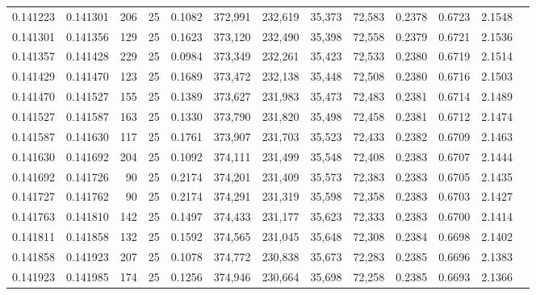 \begin{tabular}{rrrrrrrrrrrrr}
0.141223 & 0.141301 &   206 &  25 &                                     0.1082 & 372,991 & 232,619 &  35,373 &  72,583 & 0.2378 & 0.6723 & 2.1548 \\
0.141301 & 0.141356 &   129 &  25 &                                     0.1623 & 373,120 & 232,490 &  35,398 &  72,558 & 0.2379 & 0.6721 & 2.1536 \\
0.141357 & 0.141428 &   229 &  25 &                                     0.0984 & 373,349 & 232,261 &  35,423 &  72,533 & 0.2380 & 0.6719 & 2.1514 \\
0.141429 & 0.141470 &   123 &  25 &                                     0.1689 & 373,472 & 232,138 &  35,448 &  72,508 & 0.2380 & 0.6716 & 2.1503 \\
0.141470 & 0.141527 &   155 &  25 &                                     0.1389 & 373,627 & 231,983 &  35,473 &  72,483 & 0.2381 & 0.6714 & 2.1489 \\
0.141527 & 0.141587 &   163 &  25 &                                     0.1330 & 373,790 & 231,820 &  35,498 &  72,458 & 0.2381 & 0.6712 & 2.1474 \\
0.141587 & 0.141630 &   117 &  25 &                                     0.1761 & 373,907 & 231,703 &  35,523 &  72,433 & 0.2382 & 0.6709 & 2.1463 \\
0.141630 & 0.141692 &   204 &  25 &                                     0.1092 & 374,111 & 231,499 &  35,548 &  72,408 & 0.2383 & 0.6707 & 2.1444 \\
0.141692 & 0.141726 &    90 &  25 &                                     0.2174 & 374,201 & 231,409 &  35,573 &  72,383 & 0.2383 & 0.6705 & 2.1435 \\
0.141727 & 0.141762 &    90 &  25 &                                     0.2174 & 374,291 & 231,319 &  35,598 &  72,358 & 0.2383 & 0.6703 & 2.1427 \\
0.141763 & 0.141810 &   142 &  25 &                                     0.1497 & 374,433 & 231,177 &  35,623 &  72,333 & 0.2383 & 0.6700 & 2.1414 \\
0.141811 & 0.141858 &   132 &  25 &                                     0.1592 & 374,565 & 231,045 &  35,648 &  72,308 & 0.2384 & 0.6698 & 2.1402 \\
0.141858 & 0.141923 &   207 &  25 &                                     0.1078 & 374,772 & 230,838 &  35,673 &  72,283 & 0.2385 & 0.6696 & 2.1383 \\
0.141923 & 0.141985 &   174 &  25 &                                     0.1256 & 374,946 & 230,664 &  35,698 &  72,258 & 0.2385 & 0.6693 & 2.1366 \\

\end{tabular}
